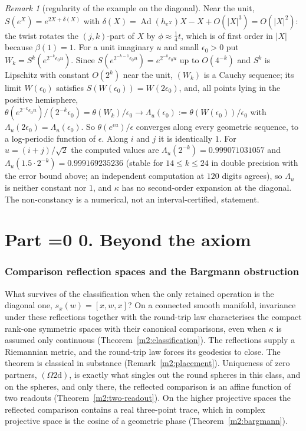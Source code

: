 \documentclass[11pt,reqno]{amsart}
\theoremstyle{definition}
\theoremstyle{remark}
\newtheorem{remark}[theorem]{Remark}
\numberwithin{equation}{section}
\newcommand{\Ad}{\operatorname{Ad}}
\newcommand{\hp}[3]{[#1,#2,#3]}
\newcounter{ppart}
\renewcommand{\theppart}{\ifnum\value{ppart}=0 0\else\Roman{ppart}\fi}
\newcommand{\paperpart}[2]{\refstepcounter{ppart}\part*{Part \theppart. #2}\label{#1}}
\begin{document}
\begin{remark}[regularity of the example on the diagonal]\label{rem:onesidedreg}
Near the unit, $S(e^X)=e^{2X+\delta(X)}$ with $\delta(X)=\Ad(h_{e^X})X-X+O(\lvert X\rvert^3)=O(\lvert X\rvert^2)$: the twist rotates the $(j,k)$-part of $X$ by
$\phi\approx\frac14t$, which is of first order in $\lvert X\rvert$ because $\beta(1)=1$.  For a unit imaginary $u$ and small $\epsilon_0>0$ put
$W_k=S^k(e^{2^{-k}\epsilon_0u})$.  Since $S(e^{2^{-k-1}\epsilon_0u})=e^{2^{-k}\epsilon_0u}$ up to $O(4^{-k})$ and $S^k$ is Lipschitz with constant $O(2^k)$ near
the unit, $(W_k)$ is a Cauchy sequence; its limit $W(\epsilon_0)$ satisfies $S(W(\epsilon_0))=W(2\epsilon_0)$, and, all points lying in the positive
hemisphere, $\theta(e^{2^{-k}\epsilon_0u})/(2^{-k}\epsilon_0)=\theta(W_k)/\epsilon_0\to\Lambda_u(\epsilon_0):=\theta(W(\epsilon_0))/\epsilon_0$ with
$\Lambda_u(2\epsilon_0)=\Lambda_u(\epsilon_0)$.  So $\theta(e^{\epsilon u})/\epsilon$ converges along every geometric sequence, to a log-periodic function of $\epsilon$.
Along $i$ and $j$ it is identically $1$.  For $u=(i+j)/\sqrt2$ the computed values are $\Lambda_u(2^{-k})=0.999071031057$ and
$\Lambda_u(1.5\cdot2^{-k})=0.999169235236$ (stable for $14\le k\le24$ in double precision with the error bound above; an independent
computation at $120$ digits agrees), so $\Lambda_u$ is neither constant nor $1$, and $\kappa$ has no second-order expansion at the diagonal.  The
non-constancy is a numerical, not an interval-certified, statement.
\end{remark}


\paperpart{part:beyond}{Beyond the axiom}

\setcounter{section}{0}
\renewcommand{\thesection}{5\Alph{section}}
\renewcommand{\theHsection}{beyond.\arabic{section}}
\section{Comparison reflection spaces and the Bargmann obstruction}\label{sec:m2}

What survives of the classification when the only retained operation is the diagonal one, $s_x(w)=\hp xwx$?  On a connected smooth
manifold, invariance under these reflections together with the round-trip law characterises the compact rank-one symmetric spaces with
their canonical comparisons, even when $\kappa$ is assumed only continuous (Theorem~\ref{m2:classification}).  The reflections supply a
Riemannian metric, and the round-trip law forces its geodesics to close.  The theorem is classical in substance (Remark~\ref{m2:placement}).
Uniqueness of zero partners, $(\Omega2\mathrm d)$, is exactly what singles out the round spheres in this class, and on the spheres, and only
there, the reflected comparison is an affine function of two readouts (Theorem~\ref{m2:two-readout}).  On the higher projective spaces
the reflected comparison contains a real three-point trace, which in complex projective space is the cosine of a geometric phase
(Theorem~\ref{m2:bargmann}).
\end{document}
